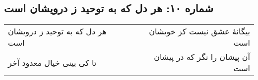 \begin{center}
\section*{شماره ۱۰: هر دل که به توحید ز درویشان است}
\label{sec:010}
\begin{longtable}{l p{0.5cm} r}
هر دل که به توحید ز درویشان است
&&
بیگانهٔ عشق نیست کز خویشان است
\\
تا کی بینی خیال معدود آخر
&&
آن پیشان را نگر که در پیشان است
\\
\end{longtable}
\end{center}
